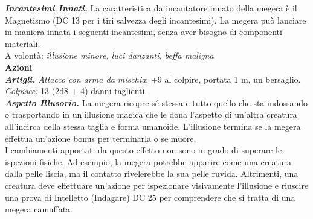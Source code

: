 \begin{multicols}{2}
\emph{\textbf{Incantesimi Innati.}} La caratteristica da incantatore innato della megera è il Magnetismo (DC  13 per i tiri salvezza degli incantesimi). La megera può lanciare in maniera innata i seguenti incantesimi, senza aver bisogno di componenti materiali.\\

A volontà: \emph{illusione minore, luci danzanti, beffa maligna}\\

\smallskip\textbf{Azioni}\\

\emph{\textbf{Artigli.} Attacco con arma da mischia}: +9 al colpire, portata 1 m, un bersaglio.\\

\emph{Colpisce:} 13 (2d8 + 4) danni taglienti.\\

\emph{\textbf{Aspetto Illusorio.}} La megera ricopre sé stessa e tutto quello che sta indossando o trasportando in un'illusione magica che le dona l'aspetto di un'altra creatura all'incirca della stessa taglia e forma umanoide. L'illusione termina se la megera effettua un'azione bonus per terminarla o se muore.\\

I cambiamenti apportati da questo effetto non sono in grado di superare le ispezioni fisiche. Ad esempio, la megera potrebbe apparire come una creatura dalla pelle liscia, ma il contatto rivelerebbe la sua pelle ruvida. Altrimenti, una creatura deve effettuare un'azione per ispezionare visivamente l'illusione e riuscire una prova di Intelletto (Indagare) DC  25 per comprendere che si tratta di una megera camuffata.\\


\end{multicols}
